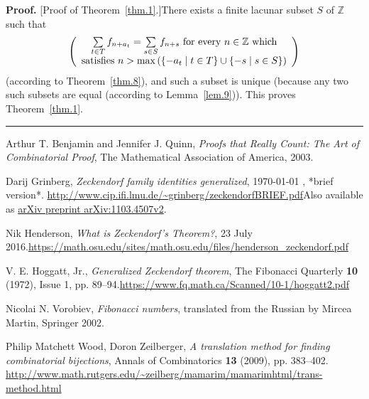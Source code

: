 \documentclass[numbers=enddot,12pt,final,onecolumn,notitlepage]{scrartcl}%
\numberwithin{exer}{section}
\theoremstyle{definition}
\newenvironment{proof}[1][Proof]{\noindent\textbf{#1.} }{\ \rule{0.5em}{0.5em}}
\let\sumnonlimits\sum
\renewcommand{\sum}{\sumnonlimits\limits}
\begin{document}
\begin{proof}
[Proof of Theorem~\ref{thm.1}.]There exists a finite lacunar subset $S$ of
$\mathbb{Z}$ such that
\[
\left(
\begin{array}
[c]{c}%
\sum\limits_{t\in T}f_{n+a_{t}}=\sum\limits_{s\in S}f_{n+s}\text{ for every
}n\in\mathbb{Z}\text{ which}\\
\text{satisfies }n>\max\left(  \left\{  -a_{t}\mid t\in T\right\}
\cup\left\{  -s\mid s\in S\right\}  \right)
\end{array}
\right)
\]
(according to Theorem~\ref{thm.8}), and such a subset is unique (because any
two such subsets are equal (according to Lemma~\ref{lem.9})). This proves
Theorem~\ref{thm.1}.
\end{proof}

\begin{thebibliography}{99999999}                                                                                         %


Arthur T. Benjamin and Jennifer J. Quinn,
\textit{Proofs that Really Count: The Art of Combinatorial Proof}, The
Mathematical Association of America, 2003.

Darij Grinberg, \textit{Zeckendorf family
identities generalized},
\today
, *brief version*.\newline%
\url{http://www.cip.ifi.lmu.de/~grinberg/zeckendorfBRIEF.pdf}\newline Also
available as \href{https://arxiv.org/abs/1103.4507v2}{arXiv preprint
arXiv:1103.4507v2}.

Nik Henderson, \textit{What is Zeckendorf's
Theorem?}, 23 July 2016.\newline\url{https://math.osu.edu/sites/math.osu.edu/files/henderson_zeckendorf.pdf}

V. E. Hoggatt, Jr., \textit{Generalized Zeckendorf
theorem}, The Fibonacci Quarterly \textbf{10} (1972), Issue 1, pp.
89--94.\newline\url{https://www.fq.math.ca/Scanned/10-1/hoggatt2.pdf}

Nicolai N. Vorobiev, \textit{Fibonacci numbers},
translated from the Russian by Mircea Martin, Springer 2002.

Philip Matchett Wood, Doron Zeilberger, \textit{A
translation method for finding combinatorial bijections}, Annals of
Combinatorics \textbf{13} (2009), pp. 383--402. \newline\url{http://www.math.rutgers.edu/~zeilberg/mamarim/mamarimhtml/trans-method.html}
\end{thebibliography}
\end{document}

